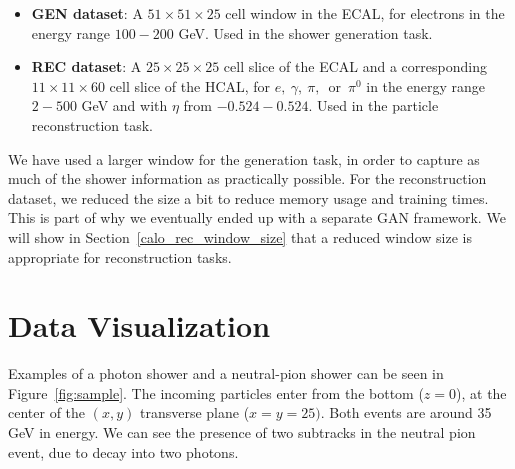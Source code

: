 \begin{itemize}
    \item {\bf GEN dataset}: A $51 \times 51 \times 25$ cell window in the
    ECAL, for electrons in the energy range $100-200$ GeV. Used in the shower generation task.
    \item {\bf REC dataset}: A $25 \times
    25 \times 25$ cell slice of the ECAL
    and a corresponding $11 \times 11 \times 60$ cell slice of the
    HCAL, for $e,~\gamma,~\pi,$~or~$\pi^0$ in the energy range $2-500$ GeV and with $\eta$ from $-0.524-0.524$. Used in the particle reconstruction task.
\end{itemize}

We have used a larger window for the generation task, in order to capture as much of the shower information as practically possible. For the reconstruction dataset, we reduced the size a bit to reduce memory usage and training times. This is part of why we eventually ended up with a separate GAN framework. We will show in Section~\ref{calo_rec_window_size} that a reduced window size is appropriate for reconstruction tasks.

\section{Data Visualization}

Examples of a photon shower and a neutral-pion shower can be seen in Figure~\ref{fig:sample}. The incoming particles enter from the bottom ($z=0$), at the center of the $(x,y)$ transverse plane ($x=y=25)$. Both events are around 35 GeV in energy. We can see the presence of two subtracks in the neutral pion event, due to decay into two photons.

